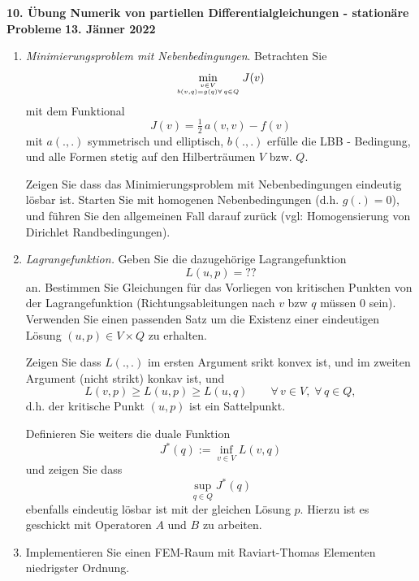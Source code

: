 \documentclass[11pt,a4paper]{report}
\begin{document}
\begin{center}
\textbf{10. \"Ubung Numerik von partiellen Differentialgleichungen - station\"are Probleme} \newline 
\textbf{13. J\"anner 2022}
\end{center}

\setcounter{enumi}{4}

\begin{enumerate}

\item {\em Minimierungsproblem mit Nebenbedingungen}. Betrachten Sie
  $$
  \min_{v \in V \atop b(v,q) = g(q) \forall \,q \in Q}  J(v)
  $$
  mit dem Funktional 
  $$
  J(v) = \tfrac{1}{2} \,  a(v,v) - f(v)
  $$
 mit $a(.,.)$ symmetrisch und elliptisch,  $b(.,.)$ erf\"ulle die LBB
 - Bedingung, und alle Formen stetig auf den Hilbertr\"aumen $V$
 bzw. $Q$.

 Zeigen Sie dass das Minimierungsproblem mit Nebenbedingungen
 eindeutig l\"osbar ist. Starten Sie mit homogenen Nebenbedingungen
 (d.h. $g(.)=0$), und f\"uhren Sie den allgemeinen Fall darauf
 zur\"uck (vgl: Homogensierung von Dirichlet Randbedingungen).

\item {\em Lagrangefunktion.} Geben Sie die dazugeh\"orige
 Lagrangefunktion 
 $$
 L(u,p) = ??
 $$
an. Bestimmen Sie Gleichungen f\"ur das Vorliegen von kritischen
Punkten von der Lagrangefunktion (Richtungsableitungen nach $v$ bzw
$q$ m\"ussen 0 sein). Verwenden Sie einen passenden Satz um die
Existenz einer eindeutigen L\"osung $(u,p) \in V \times Q$ zu erhalten.

Zeigen Sie dass $L(.,.)$ im ersten Argument srikt konvex ist, und im
zweiten Argument (nicht strikt) konkav ist, und 
$$
L(v,p) \geq L(u,p) \geq L(u,q) \qquad \forall \, v \in V, \; \forall
\, q \in Q,
$$
d.h. der kritische Punkt $(u,p)$ ist ein Sattelpunkt.

Definieren Sie weiters die duale Funktion
$$
J^\ast(q) := \inf_{v \in V} L(v,q)
$$
und zeigen Sie dass
$$
\sup_{q \in Q} J^\ast (q)
$$
ebenfalls eindeutig l\"osbar ist mit der gleichen L\"osung $p$.
Hierzu ist es geschickt mit Operatoren $A$ und $B$ zu arbeiten.

\item Implementieren Sie einen FEM-Raum mit Raviart-Thomas Elementen
  niedrigster Ordnung.


\end{enumerate}
\end{document}
